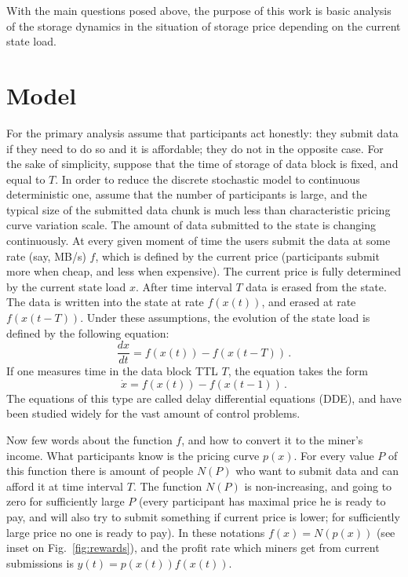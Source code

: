 \documentclass[preprint]{revtex4-1}
\begin{document}
With the main questions posed above, the purpose of this work is basic analysis
of the storage dynamics in the situation of storage price depending on the
current state load. 

\section{Model}
For the primary analysis assume that participants act honestly: they submit
data if they need to do so and it is affordable; they do not in the opposite
case. For the sake of simplicity, suppose that the time of storage of data
block is fixed, and equal to $T$. In order to reduce the discrete stochastic
model to continuous deterministic one, assume that the number of participants
is large, and the typical size of the submitted data chunk is much less than
characteristic pricing curve variation scale. The amount of data submitted to
the state is changing continuously. At every given moment of time the users
submit the data at some rate (say, MB/s) $f$, which is defined by the current
price (participants submit more when cheap, and less when expensive). The
current price is fully determined by the current state load $x$. After time
interval $T$ data is erased from the state. The data is written into the state
at rate $f(x(t))$, and erased at rate $f(x(t-T))$. Under these assumptions,
the evolution of the state load is defined by the following equation:
\begin{equation}
    \frac{dx}{dt} = f(x(t))-f(x(t-T))\,.
    \label{eq:dde0}
\end{equation}
If one measures time in the data block TTL $T$, the equation takes the form
\begin{equation}
    \dot{x} = f(x(t))-f(x(t-1))\,.
    \label{eq:dde1}
\end{equation}
The equations of this type are called delay differential equations (DDE), and have
been studied widely for the vast amount of control problems.

Now few words about the function $f$, and how to convert it to the miner's
income. What participants know is the pricing curve $p(x)$. For every value $P$
of this function there is amount of people $N(P)$ who want to submit data and
can afford it at time interval $T$. The function $N(P)$ is non-increasing, and
going to zero for sufficiently large $P$ (every participant has maximal price he
is ready to pay, and will also try to submit something if current price is
lower; for sufficiently large price no one is ready to pay). In these notations
$f(x)=N(p(x))$ (see inset on Fig.~\ref{fig:rewards}), and the profit rate which
miners get from current submissions is $y(t) = p(x(t))f(x(t))$.
\end{document}
